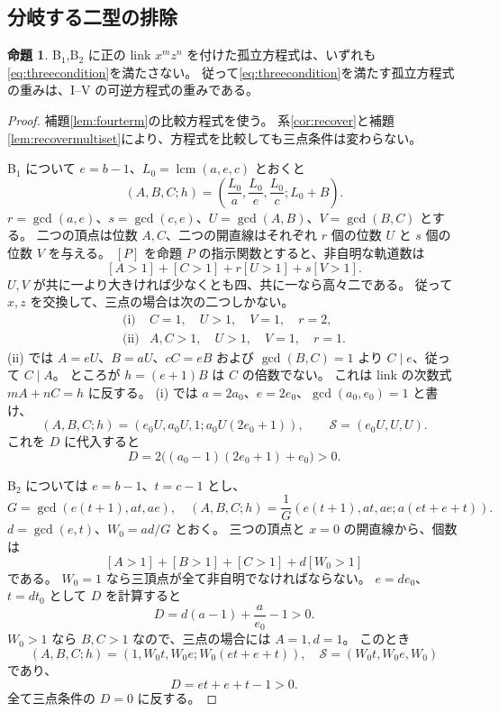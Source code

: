 \documentclass[11pt,a4paper]{ltjsarticle}
\numberwithin{equation}{section}
\theoremstyle{definition}
\newtheorem{proposition}[theorem]{命題}
\newcommand{\lcm}{\operatorname{lcm}}\newcommand{\Frac}{\operatorname{Frac}}\newcommand{\Spec}{\operatorname{Spec}}
\begin{document}
\subsection{分岐する二型の排除}
\begin{proposition}\label{prop:branched}
B$_1$,B$_2$ に正の link $x^m z^n$ を付けた孤立方程式は、いずれも\eqref{eq:threecondition}を満たさない。
従って\eqref{eq:threecondition}を満たす孤立方程式の重みは、I--V の可逆方程式の重みである。
\end{proposition}
\begin{proof}
補題\ref{lem:fourterm}の比較方程式を使う。
系\ref{cor:recover}と補題\ref{lem:recovermultiset}により、方程式を比較しても三点条件は変わらない。

B$_1$ について $e=b-1$、$L_0=\lcm(a,e,c)$ とおくと
\[
 (A,B,C;h)=\left(\frac{L_0}{a},\frac{L_0}{e},\frac{L_0}{c};L_0+B\right).
\]
$r=\gcd(a,e)$、$s=\gcd(c,e)$、$U=\gcd(A,B)$、$V=\gcd(B,C)$ とする。
二つの頂点は位数 $A,C$、二つの開直線はそれぞれ $r$ 個の位数 $U$ と $s$ 個の位数 $V$ を与える。
$[P]$ を命題 $P$ の指示関数とすると、非自明な軌道数は
\[
 [A>1]+[C>1]+r[U>1]+s[V>1].
\]
$U,V$ が共に一より大きければ少なくとも四、共に一なら高々二である。
従って $x,z$ を交換して、三点の場合は次の二つしかない。
\[
 \begin{array}{ll}
 \text{(i)}& C=1,\quad U>1,\quad V=1,\quad r=2,\\
 \text{(ii)}& A,C>1,\quad U>1,\quad V=1,\quad r=1.
 \end{array}
\]
(ii) では $A=eU$、$B=aU$、$cC=eB$ および $\gcd(B,C)=1$ より $C\mid e$、従って $C\mid A$。
ところが $h=(e+1)B$ は $C$ の倍数でない。
これは link の次数式 $mA+nC=h$ に反する。
(i) では $a=2a_0$、$e=2e_0$、$\gcd(a_0,e_0)=1$ と書け、
\[
 (A,B,C;h)=(e_0U,a_0U,1;a_0U(2e_0+1)),\qquad
 \mathcal S=(e_0U,U,U).
\]
これを $D$ に代入すると
\begin{equation}\label{eq:B1positive}
 D=2\bigl((a_0-1)(2e_0+1)+e_0\bigr)>0.
\end{equation}

B$_2$ については $e=b-1$、$t=c-1$ とし、
\[
 G=\gcd(e(t+1),at,ae),\quad
 (A,B,C;h)=\frac1G(e(t+1),at,ae;a(et+e+t)).
\]
$d=\gcd(e,t)$、$W_0=ad/G$ とおく。
三つの頂点と $x=0$ の開直線から、個数は
\[
 [A>1]+[B>1]+[C>1]+d[W_0>1]
\]
である。
$W_0=1$ なら三頂点が全て非自明でなければならない。
$e=de_0$、$t=dt_0$ として $D$ を計算すると
\begin{equation}\label{eq:B2positive1}
 D=d(a-1)+\frac{a}{e_0}-1>0.
\end{equation}
$W_0>1$ なら $B,C>1$ なので、三点の場合には $A=1,d=1$。
このとき
\[
 (A,B,C;h)=(1,W_0t,W_0e;W_0(et+e+t)),\quad
 \mathcal S=(W_0t,W_0e,W_0)
\]
であり、
\begin{equation}\label{eq:B2positive2}
 D=et+e+t-1>0.
\end{equation}
全て三点条件の $D=0$ に反する。
\end{proof}
\end{document}
